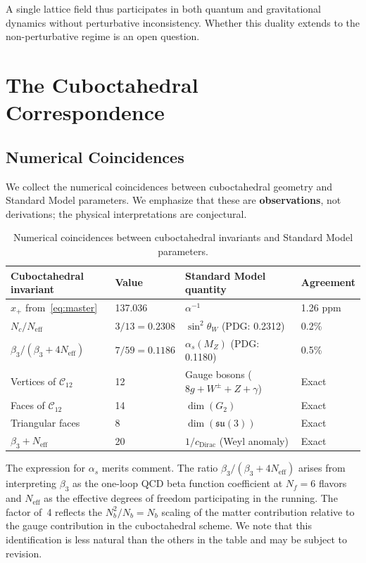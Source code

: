 \documentclass[12pt,a4paper]{article}
\begin{document}
A single lattice field thus participates in both quantum and gravitational dynamics without perturbative inconsistency. Whether this duality extends to the non-perturbative regime is an open question.

\section{The Cuboctahedral Correspondence}

\subsection{Numerical Coincidences}

We collect the numerical coincidences between cuboctahedral geometry and Standard Model parameters. We emphasize that these are \textbf{observations}, not derivations; the physical interpretations are conjectural.

\begin{table}[H]
\centering
\begin{tabular}{@{}llll@{}}
\toprule
Cuboctahedral invariant & Value & Standard Model quantity & Agreement \\
\midrule
$x_{+}$ from~\eqref{eq:master} & 137.036 & $\alpha^{-1}$ & 1.26 ppm \\
$N_{c}/N_{\mathrm{eff}}$ & $3/13 = 0.2308$ & $\sin^{2}\theta_{W}$ (PDG: 0.2312) & 0.2\% \\
$\beta_{3}/(\beta_{3} + 4N_{\mathrm{eff}})$ & $7/59 = 0.1186$ & $\alpha_{s}(M_{Z})$ (PDG: 0.1180) & 0.5\% \\
Vertices of $\mathcal{C}_{12}$ & 12 & Gauge bosons ($8g + W^{\pm} + Z + \gamma$) & Exact \\
Faces of $\mathcal{C}_{12}$ & 14 & $\dim(G_{2})$ & Exact \\
Triangular faces & 8 & $\dim(\mathfrak{su}(3))$ & Exact \\
$\beta_{3} + N_{\mathrm{eff}}$ & 20 & $1/c_{\mathrm{Dirac}}$ (Weyl anomaly) & Exact \\
\bottomrule
\end{tabular}
\caption{Numerical coincidences between cuboctahedral invariants and Standard Model parameters.}
\label{tab:coincidences}
\end{table}

\noindent The expression for $\alpha_{s}$ merits comment. The ratio $\beta_{3}/(\beta_{3} + 4N_{\mathrm{eff}})$ arises from interpreting $\beta_{3}$ as the one-loop QCD beta function coefficient at $N_{f} = 6$ flavors and $N_{\mathrm{eff}}$ as the effective degrees of freedom participating in the running. The factor of~4 reflects the $N_{b}^{2}/N_{b} = N_{b}$ scaling of the matter contribution relative to the gauge contribution in the cuboctahedral scheme. We note that this identification is less natural than the others in the table and may be subject to revision.
\end{document}

